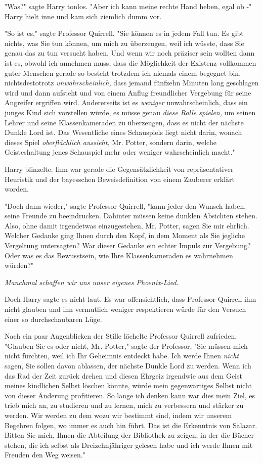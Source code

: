 {"Was?" sagte Harry tonlos. "Aber ich kann meine rechte Hand heben, egal ob -" Harry hielt inne und kam sich ziemlich dumm vor.

"So ist es," sagte Professor Quirrell. "Sie können es in jedem Fall tun. Es gibt nichts, was Sie tun können, um mich zu überzeugen, weil ich wüsste, dass Sie genau das zu tun versucht haben. Und wenn wir noch präziser sein wollten dann ist es, obwohl ich annehmen muss, dass die Möglichkeit der Existenz vollkommen guter Menschen gerade so besteht trotzdem ich niemals einem begegnet bin, nichtsdestotrotz \emph{unwahrscheinlich,} dass jemand fünfzehn Minuten lang geschlagen wird und dann aufsteht und von einem Anflug freundlicher Vergebung für seine Angreifer ergriffen wird. Andererseits ist es \emph{weniger} unwahrscheinlich, dass ein junges Kind sich vorstellen würde, es müsse genau \emph{diese Rolle spielen,} um seinen Lehrer und seine Klassenkameraden zu überzeugen, dass es nicht der nächste Dunkle Lord ist. Das Wesentliche eines Schauspiels liegt nicht darin, wonach dieses Spiel \emph{oberflächlich aussieht,} Mr. Potter, sondern darin, welche Geisteshaltung jenes Schauspiel mehr oder weniger wahrscheinlich macht."

Harry blinzelte. Ihm war gerade die Gegensätzlichkeit von repräsentativer Heuristik und der bayesschen Beweisdefinition von einem Zauberer erklärt worden.

"Doch dann wieder," sagte Professor Quirrell, "kann jeder den Wunsch haben, seine Freunde zu beeindrucken. Dahinter müssen keine dunklen Absichten stehen. Also, ohne damit irgendetwas einzugestehen, Mr. Potter, sagen Sie mir ehrlich. Welcher Gedanke ging Ihnen durch den Kopf, in dem Moment als Sie jegliche Vergeltung untersagten? War dieser Gedanke ein echter Impuls zur Vergebung? Oder was es das Bewusstsein, wie Ihre Klassenkameraden es wahrnehmen würden?"

\emph{Manchmal schaffen wir uns unser eigenes Phoenix-Lied.}

Doch Harry sagte es nicht laut. Es war offensichtlich, dass Professor Quirrell ihm nicht glauben und ihn vermutlich weniger respektieren würde für den Versuch einer so durchschaubaren Lüge.

Nach ein paar Augenblicken der Stille lächelte Professor Quirrell zufrieden. "Glauben Sie es oder nicht, Mr. Potter," sagte der Professor, "Sie müssen mich nicht fürchten, weil ich Ihr Geheimnis entdeckt habe. Ich werde Ihnen \emph{nicht} sagen, Sie sollen davon ablassen, der nächste Dunkle Lord zu werden. Wenn ich das Rad der Zeit zurück drehen und diesen Ehrgeiz irgendwie aus dem Geist meines kindlichen Selbst löschen könnte, würde mein gegenwärtiges Selbst nicht von dieser Änderung profitieren. So lange ich denken kann war dies mein Ziel, es trieb mich an, zu studieren und zu lernen, mich zu verbessern und stärker zu werden. Wir werden zu dem wozu wir bestimmt sind, indem wir unserem Begehren folgen, wo immer es auch hin führt. Das ist die Erkenntnis von Salazar. Bitten Sie mich, Ihnen die Abteilung der Bibliothek zu zeigen, in der die Bücher stehen, die ich selbst als Dreizehnjähriger gelesen habe und ich werde Ihnen mit Freuden den Weg weisen."

}
